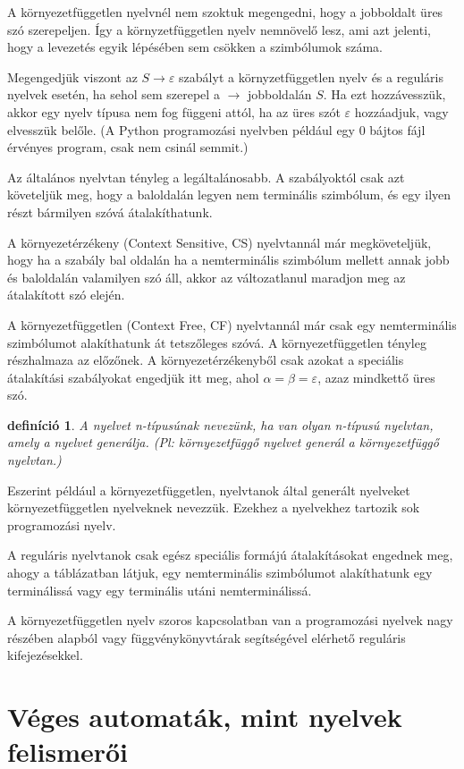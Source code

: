\documentclass[a4paper]{article}
\newtheorem{definicio}{definíció}[section]
\begin{document}
A környezetfüggetlen nyelvnél nem szoktuk megengedni, hogy a jobboldalt
üres szó szerepeljen. Így a környzetfüggetlen nyelv nemnövelő lesz, ami
azt jelenti, hogy a levezetés egyik lépésében sem csökken a szimbólumok
száma.

Megengedjük viszont az $S\to \varepsilon$ szabályt a környzetfüggetlen
nyelv és a reguláris nyelvek esetén, ha sehol sem szerepel a $\to$
jobboldalán $S$. Ha ezt hozzávesszük, akkor egy nyelv típusa nem fog
függeni attól, ha az üres szót $\varepsilon$ hozzáadjuk, vagy elvesszük
belőle. (A Python programozási nyelvben például egy 0 bájtos fájl
érvényes program, csak nem csinál semmit.)

Az általános nyelvtan tényleg a legáltalánosabb. A
szabályoktól csak azt követeljük meg, hogy a baloldalán legyen nem
terminális szimbólum, és egy ilyen részt bármilyen szóvá átalakíthatunk.

A környezetérzékeny (Context Sensitive, CS) nyelvtannál már
megköveteljük, hogy ha a szabály bal oldalán ha a nemterminális
szimbólum mellett annak jobb és baloldalán valamilyen szó áll, akkor az
változatlanul maradjon meg az átalakított szó elején.

A környezetfüggetlen (Context Free, CF) nyelvtannál már csak
egy nemterminális szimbólumot alakíthatunk át tetszőleges szóvá. A
környezetfüggetlen tényleg részhalmaza az előzőnek.  A
környezetérzékenyből csak azokat a speciális átalakítási szabályokat
engedjük itt meg, ahol $\alpha=\beta=\varepsilon$, azaz mindkettő üres
szó.

\begin{definicio}
A nyelvet n-típusúnak nevezünk, ha van olyan n-típusú
nyelvtan, amely a nyelvet generálja. (Pl: környezetfüggő nyelvet generál
a környezetfüggő nyelvtan.)
\end{definicio}

Eszerint például a környezetfüggetlen, nyelvtanok által generált
nyelveket környezetfüggetlen nyelveknek nevezzük. Ezekhez a nyelvekhez
tartozik sok programozási nyelv.

A reguláris nyelvtanok csak egész speciális formájú átalakításokat
engednek meg, ahogy a táblázatban látjuk, egy nemterminális szimbólumot
alakíthatunk egy terminálissá vagy egy terminális utáni nemterminálissá.

A környezetfüggetlen nyelv szoros kapcsolatban van a programozási
nyelvek nagy részében alapból vagy függvénykönyvtárak segítségével
elérhető reguláris kifejezésekkel.

\section{Véges automaták, mint nyelvek felismerői}
\end{document}
